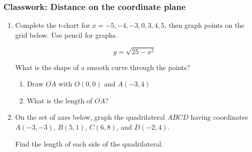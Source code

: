 \documentclass[12pt, twoside]{article}
\begin{document}
\subsubsection*{Classwork: Distance on the coordinate plane}
  \begin{enumerate}

    \item Complete the t-chart for $x=-5,-4,-3,0,3,4,5$, then graph points on the grid below. Use pencil for graphs.

        \[y = \sqrt{25-x^2}\]

        What is the shape of a smooth curve through the points?
      \begin{center} %
      \end{center}

    \begin{enumerate}
      \item Draw $\overline{OA}$ with $O(0,0)$ and $A(-3,4)$
      \item What is the length of $\overline{OA}$? \vspace{1.5cm}
    \end{enumerate}



\newpage

  \item On the set of axes below, graph the quadrilateral $ABCD$ having coordinates $A(-3,-3)$, $B(5,1)$, $C(6,8)$, and $D(-2,4)$.
    \begin{center} %
    \end{center}
    Find the length of each side of the quadrilateral.



  \end{enumerate}

  
\end{document}
